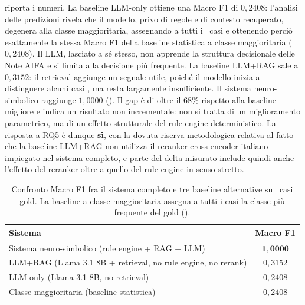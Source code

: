  riporta i numeri. La baseline LLM-only ottiene una Macro F1 di $0{,}2408$: l'analisi delle predizioni rivela che il modello, privo di regole e di contesto recuperato, degenera alla classe maggioritaria, assegnando  a tutti i \goldn\ casi e ottenendo perciò esattamente la stessa Macro F1 della baseline statistica a classe maggioritaria ($0{,}2408$). Il LLM, lasciato a sé stesso, non apprende la struttura decisionale delle Note AIFA e si limita alla decisione più frequente. La baseline LLM+RAG sale a $0{,}3152$: il retrieval aggiunge un segnale utile, poiché il modello inizia a distinguere alcuni casi , ma resta largamente insufficiente. Il sistema neuro-simbolico raggiunge $1{,}0000$ (). Il gap è di oltre il $68\%$ rispetto alla baseline migliore e indica un risultato non incrementale: non si tratta di un miglioramento parametrico, ma di un effetto strutturale del rule engine deterministico. La risposta a RQ5 è dunque \textbf{sì}, con la dovuta riserva metodologica relativa al fatto che la baseline LLM+RAG non utilizza il reranker cross-encoder italiano impiegato nel sistema completo, e parte del delta misurato include quindi anche l'effetto del reranker oltre a quello del rule engine in senso stretto.

\begin{table}[t]
  \centering
  \caption{Confronto Macro F1 fra il sistema completo e tre baseline alternative su \goldn\ casi gold. La baseline a classe maggioritaria assegna a tutti i casi la classe più frequente del gold ().}
  \label{tab:baselines}
  \small
  \begin{tabular}{lc}
    \toprule
    Sistema & Macro F1 \\
    \midrule
    Sistema neuro-simbolico (rule engine + RAG + LLM) & $\mathbf{1{,}0000}$ \\
    LLM+RAG (Llama 3.1 8B + retrieval, no rule engine, no rerank) & $0{,}3152$ \\
    LLM-only (Llama 3.1 8B, no retrieval) & $0{,}2408$ \\
    Classe maggioritaria (baseline statistica) & $0{,}2408$ \\
    \bottomrule
  \end{tabular}
\end{table}

